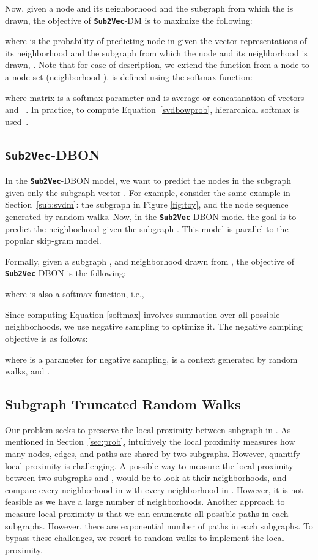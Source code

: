 \documentclass[sigconf]{acmart}
\newcommand{\alg}{{\bf {\tt Sub2Vec}}\xspace}
\begin{document}
Now, given a node  and its neighborhood  and the subgraph  from which the  is drawn, the objective of \alg-DM is to maximize the following:


where  is the probability of predicting node  in  given the vector representations of its neighborhood  and the subgraph from which the node and its neighborhood is drawn, .  Note that for ease of description, we extend the function  from a node to a node set (neighborhood ).   is defined using the softmax function:


where matrix  is a softmax parameter and  is average or concatanation of vectors  and ~\cite{le2014distributed}. In practice, to compute Equation~\ref{svdbowprob}, hierarchical softmax is used~\cite{mikolov2013distributed}.
 

\subsection{\alg-DBON}

In the \alg-DBON model,  we want to predict the nodes in the subgraph given only the subgraph vector . 
For example, consider the same example in Section~\ref{sub:svdm}: the subgraph   in Figure \ref{fig:toy}, and the node sequence  generated by random walks. Now, in the \alg-DBON model the goal is to predict the neighborhood  given the subgraph . This model is parallel to the popular skip-gram model.


Formally, given a subgraph , and neighborhood  drawn from , the objective of \alg-DBON is the following:

where  is also a softmax function, i.e., 


Since computing Equation \ref{softmax} involves summation over all possible neighborhoods, we use negative sampling to optimize it.
The negative sampling objective is as follows:

{
\small

}
where  is a parameter for negative sampling,  is a context generated by random walks, and .

\subsection{Subgraph Truncated Random Walks}
\label{sec:nei}
Our problem seeks to preserve the local proximity between subgraph in . As mentioned in Section~\ref{sec:prob}, intuitively the local proximity measures how many nodes, edges, and paths are shared by two subgraphs. However, quantify local proximity is challenging.
A possible way to measure the local proximity between two subgraphs  and , would be to look at their neighborhoods, and compare every neighborhood in  with every neighborhood in . However, it is not feasible as we have a large number of neighborhoods. Another approach to measure local proximity is that we can enumerate all possible paths in each subgraphs. However, there are exponential number of paths in each subgraphs. To bypass these challenges, we resort to random walks to implement the local proximity. 
\end{document}
